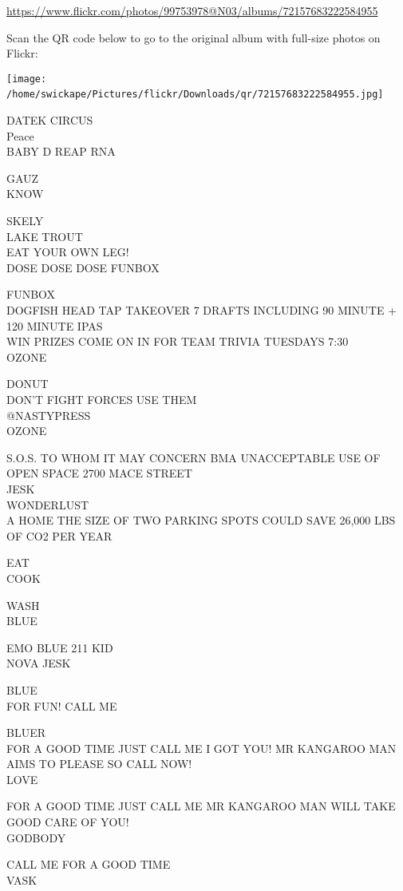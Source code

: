 \documentclass[10pt,letterpaper]{article}
\begin{document}
\url{https://www.flickr.com/photos/99753978@N03/albums/72157683222584955}

Scan the QR code below to go to the original album with full-size photos on Flickr:

\texttt{[image: /home/swickape/Pictures/flickr/Downloads/qr/72157683222584955.jpg]}
\

DATEK CIRCUS\\
Peace\\
BABY D REAP RNA

GAUZ\\
KNOW

SKELY\\
LAKE TROUT\\
EAT YOUR OWN LEG!\\
DOSE DOSE DOSE FUNBOX

FUNBOX\\
DOGFISH HEAD TAP TAKEOVER 7 DRAFTS INCLUDING 90 MINUTE + 120 MINUTE IPAS\\
WIN PRIZES COME ON IN FOR TEAM TRIVIA TUESDAYS 7:30\\
OZONE

DONUT\\
DON'T FIGHT FORCES USE THEM\\
@NASTYPRESS\\
OZONE

S.O.S. TO WHOM IT MAY CONCERN BMA UNACCEPTABLE USE OF OPEN SPACE 2700 MACE STREET\\
JESK\\
WONDERLUST\\
A HOME THE SIZE OF TWO PARKING SPOTS COULD SAVE 26,000 LBS OF CO2 PER YEAR

EAT\\
COOK

WASH\\
BLUE

EMO BLUE 211 KID\\
NOVA JESK

BLUE\\
FOR FUN!  CALL ME

BLUER\\
FOR A GOOD TIME JUST CALL ME I GOT YOU!  MR KANGAROO MAN AIMS TO PLEASE SO CALL NOW!\\
LOVE

FOR A GOOD TIME JUST CALL ME MR KANGAROO MAN WILL TAKE GOOD CARE OF YOU!\\
GODBODY

CALL ME FOR A GOOD TIME\\
VASK
\end{document}
